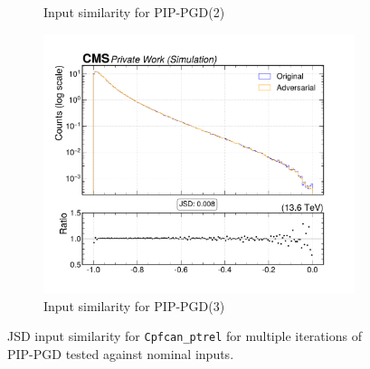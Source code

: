 \begin{figure}[htbp]
\begin{subfigure}[t]{0.32\textwidth}
    \caption*{Input similarity for PIP-PGD(2)}
  \end{subfigure}\hfill
  \begin{subfigure}[t]{0.32\textwidth}
    \includegraphics[width=\linewidth]{media/output/features/compare/combined_it_3/cmp_cpf_arr_Cpfcan_ptrel.pdf}
    \caption*{Input similarity for PIP-PGD(3)}
  \end{subfigure}

  \caption*{JSD input similarity for \texttt{Cpfcan\_ptrel} for multiple iterations of PIP-PGD tested against nominal inputs.}
  \label{fig:combined_input_Cpfcan_ptrel}
\end{figure}


